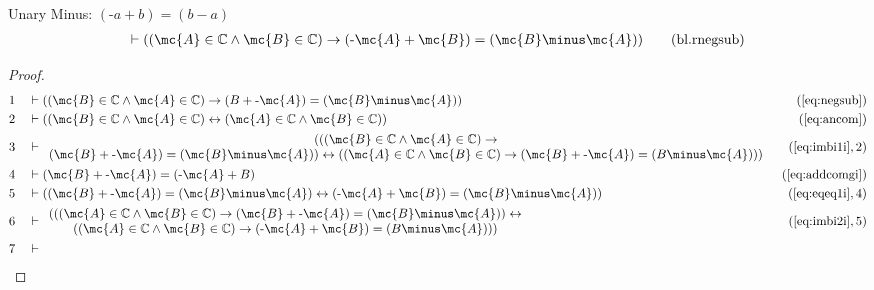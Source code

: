 \begin{lemma} {Unary Minus: $( \textrm{-} a + b ) = ( b
\minus a )$}
\begin{align}
\vdash ( ( \mc{A} \in \mathbb{C} \wedge \mc{B} \in \mathbb{C} ) \rightarrow ( \textrm{-}
    \mc{A} + \mc{B} ) = ( \mc{B} \minus \mc{A} ) )\label{eq:bl.rnegsub}\tag{bl.rnegsub}
\end{align}
\end{lemma}


\begin{proof}
\begin{align}
  1 &&  & \vdash ( ( \mc{B} \in \mathbb{C} \wedge \mc{A} \in \mathbb{C} ) \rightarrow ( B
     + \textrm{-} \mc{A} ) = ( \mc{B} \minus \mc{A} )
     )&(\mbox{\ref{eq:negsub}})\notag
  \\ 2 &&  & \vdash ( ( \mc{B} \in \mathbb{C} \wedge \mc{A} \in \mathbb{C} )
     \leftrightarrow ( \mc{A} \in \mathbb{C} \wedge \mc{B} \in
     \mathbb{C} ) )&(\mbox{\ref{eq:ancom}})\notag
  \\ 3 &&  & \vdash 
     \begin{array}{c}
     ( ( ( \mc{B} \in \mathbb{C} \wedge \mc{A} \in \mathbb{C} )
     \rightarrow \\
      ( \mc{B} + \textrm{-} \mc{A} ) = ( \mc{B} \minus \mc{A} ) )
     \leftrightarrow ( ( \mc{A} \in \mathbb{C} \wedge \mc{B} \in
     \mathbb{C} ) \rightarrow ( \mc{B} + \textrm{-} \mc{A} ) = ( B
     \minus \mc{A} ) ) )
     \end{array}
     &(\mbox{\ref{eq:imbi1i}},2)\notag
  \\ 4 &&  & \vdash ( \mc{B} + \textrm{-} \mc{A} ) = ( \textrm{-} \mc{A} + B
     )&(\mbox{\ref{eq:addcomgi}})\notag
  \\ 5 &&  & \vdash ( ( \mc{B} + \textrm{-} \mc{A} ) = ( \mc{B} \minus \mc{A} ) \leftrightarrow (
     \textrm{-} \mc{A} + \mc{B} ) = ( \mc{B} \minus \mc{A} )
     )&(\mbox{\ref{eq:eqeq1i}},4)\notag
  \\ 6 &&  & \vdash  
     \begin{array}{c}
     ( ( ( \mc{A} \in \mathbb{C} \wedge \mc{B} \in \mathbb{C} )
     \rightarrow ( \mc{B} + \textrm{-} \mc{A} ) = ( \mc{B} \minus \mc{A} ) )
     \leftrightarrow \\
     ( ( \mc{A} \in \mathbb{C} \wedge \mc{B} \in
     \mathbb{C} ) \rightarrow ( \textrm{-} \mc{A} + \mc{B} ) = ( B
     \minus \mc{A} ) ) )
     \end{array}
     &(\mbox{\ref{eq:imbi2i}},5)\notag
  \\ 7 &&  & \vdash  

\end{align}
\end{proof}
